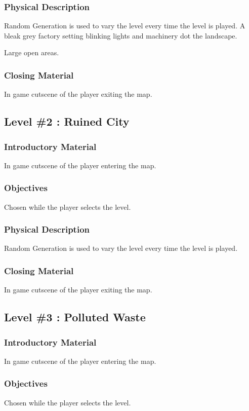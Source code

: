 \documentclass{article}
\begin{document}
\subsubsection{Physical Description}
\label{sec:orgbfc1ddb}
Random Generation is used to vary the level every time the level is played.
A bleak grey factory setting blinking lights and machinery dot the landscape.

Large open areas.
\subsubsection{Closing Material}
\label{sec:org3023a55}
In game cutscene of the player exiting the map.
\subsection{Level \#2 : Ruined City}
\label{sec:orgd623d11}
\subsubsection{Introductory Material}
\label{sec:org9c1c443}
In game cutscene of the player entering the map.
\subsubsection{Objectives}
\label{sec:orga463188}
Chosen while the player selects the level.
\subsubsection{Physical Description}
\label{sec:org6a8306b}
Random Generation is used to vary the level every time the level is played.
\subsubsection{Closing Material}
\label{sec:org6316590}
In game cutscene of the player exiting the map.
\subsection{Level \#3 : Polluted Waste}
\label{sec:org5ac0185}
\subsubsection{Introductory Material}
\label{sec:org706981c}
In game cutscene of the player entering the map.
\subsubsection{Objectives}
\label{sec:orgf63eb72}
Chosen while the player selects the level.
\end{document}
